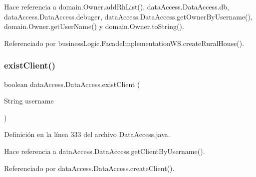 Hace referencia a domain.\+Owner.\+add\+Rh\+List(), data\+Access.\+Data\+Access.\+db, data\+Access.\+Data\+Access.\+debuger, data\+Access.\+Data\+Access.\+get\+Owner\+By\+Username(), domain.\+Owner.\+get\+User\+Name() y domain.\+Owner.\+to\+String().



Referenciado por business\+Logic.\+Facade\+Implementation\+W\+S.\+create\+Rural\+House().

\mbox{\label{classdata_access_1_1_data_access_a0023d35ffec2c84262c6dad259f812ae}} 
\subsubsection{\texorpdfstring{existClient()}{existClient()}}
{\footnotesize\ttfamily boolean data\+Access.\+Data\+Access.\+exist\+Client (\begin{DoxyParamCaption}\item[{String}]{username }\end{DoxyParamCaption})}



Definición en la línea 333 del archivo Data\+Access.\+java.


\begin{DoxyCode}{0}

\end{DoxyCode}


Hace referencia a data\+Access.\+Data\+Access.\+get\+Client\+By\+Username().



Referenciado por data\+Access.\+Data\+Access.\+create\+Client().

\mbox{\label{classdata_access_1_1_data_access_a50b55de13fbd4c9848f7c3ee8a57db93}} 
